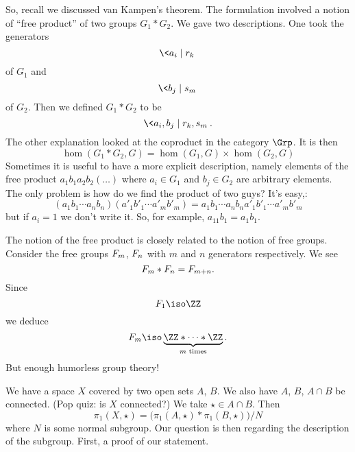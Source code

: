 
So, recall we discussed van Kampen's theorem. The formulation
involved a notion of ``free product'' of two groups $G_1*G_2$. We
gave two descriptions. One took the generators
\begin{equation}
\<a_{i}\mid r_{k}\>
\end{equation}
of $G_1$ and
\begin{equation}
\<b_{j}\mid s_{m}\>
\end{equation}
of $G_2$. Then we defined $G_1*G_2$ to be 
\begin{equation}
\<a_i,b_j\mid r_k,s_m\>.
\end{equation}
The other explanation looked at the coproduct in the category $\Grp$.
It is then
\begin{equation}
\hom(G_1*G_2,G)=\hom(G_1,G)\times\hom(G_2,G)
\end{equation}
Sometimes it is useful to have a more explicit description,
namely elements of the free product $a_1b_1a_2b_2(\dots)$ where
$a_i\in G_1$ and $b_j\in G_2$ are arbitrary elements. The only
problem is how do we find the product of two guys? It's easy,:
\begin{equation}
(a_1b_1\cdots a_nb_n)(a'_1b'_1\cdots a'_mb'_m)=
a_1b_1\cdots a_nb_na'_1b'_1\cdots a'_mb'_m
\end{equation}
but if $a_{i}=1$ we don't write it. So, for example,
$a_11b_1=a_1b_1$. 

The notion of the free product is closely related to the notion
of free groups. Consider the free groups $F_{m}$,
$F_{n}$ with $m$ and $n$ generators respectively. We see
\begin{equation}
F_{m}*F_{n}=F_{m+n}.
\end{equation}
Since
\begin{equation}
\freeGrp{1}\iso\ZZ
\end{equation}
we deduce
\begin{equation}
\freeGrp{m}\iso\underbrace{\ZZ*\dots*\ZZ}_{\text{$m$ times}}.
\end{equation}
But enough humorless group theory!

We have a space $X$ covered by two open sets $A$, $B$. We also
have $A$, $B$, $A\cap B$ be connected. (Pop quiz: is $X$
connected?) We take $\star\in A\cap B$. Then
\begin{equation}
\pi_{1}(X,\star)=\bigl(\pi_{1}(A,\star)*\pi_{1}(B,\star)\bigr)/N
\end{equation}
where $N$ is some normal subgroup. Our question is then regarding
the description of the subgroup. First, a proof of our statement.

